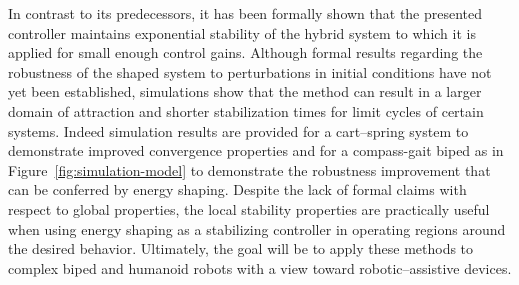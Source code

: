 \documentclass[english]{article}
\begin{document}
% 
% 
% 


In contrast to its predecessors, it has been formally shown that the presented
controller maintains exponential stability of the hybrid system to which it is
applied for small enough control gains.
%
Although formal results regarding the robustness of the shaped system to
perturbations in initial conditions have not yet been established, simulations
show that the method can result in a larger domain of attraction and shorter
stabilization times for limit cycles of certain systems.
%
Indeed simulation results are provided for a cart--spring system to demonstrate
improved convergence properties and for a compass-gait
biped as in Figure~\ref{fig:simulation-model} to
demonstrate the robustness improvement that can be conferred by energy shaping.
%
Despite the lack of formal claims with respect to global properties, the local
stability properties are practically useful when using energy shaping as a
stabilizing controller in operating regions around the desired behavior.
%
Ultimately, the goal will be to apply these methods to complex biped and
humanoid robots with a view toward robotic--assistive devices.



\end{document}
